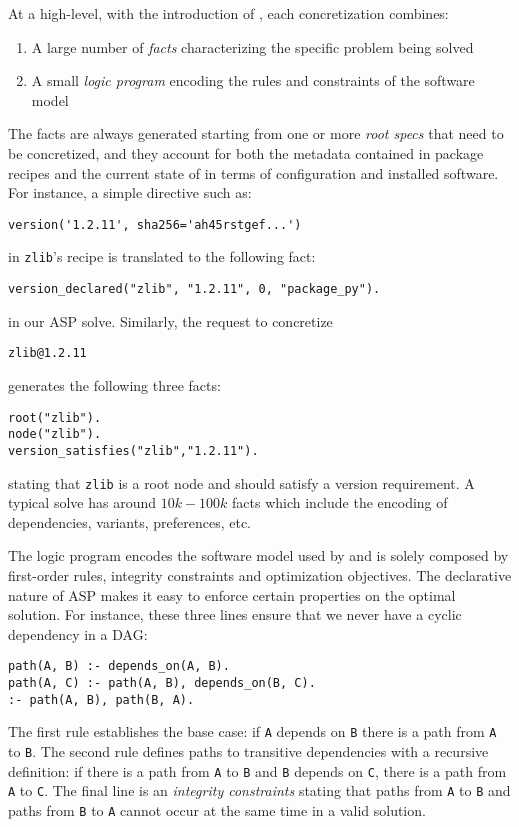 At a high-level, with the introduction of \clingo, each concretization
combines:
\begin{enumerate}
\item A large number of \emph{facts} characterizing the specific problem being solved
\item A small \emph{logic program} encoding the rules and constraints of the software model
\end{enumerate}
The facts are always generated starting from one or more 
\emph{root specs} that need to be concretized, and they account 
for both the metadata contained in package recipes and the 
current state of \spack{} in terms of configuration and 
installed software.
For instance, a simple directive such as:
\begin{verbatim}
version('1.2.11', sha256='ah45rstgef...')
\end{verbatim}
in \texttt{zlib}'s recipe is translated to the following fact:
\begin{verbatim}
version_declared("zlib", "1.2.11", 0, "package_py").
\end{verbatim}
in our ASP solve. Similarly, the request to concretize
\begin{verbatim}
zlib@1.2.11
\end{verbatim}
generates the following three facts:
\begin{verbatim}
root("zlib").
node("zlib").
version_satisfies("zlib","1.2.11").
\end{verbatim}
stating that \texttt{zlib} is a root node and should satisfy
a version requirement.
A typical solve has around $10k-100k$ facts which include
the encoding of dependencies, variants, preferences, etc.

The logic program encodes the software model used by \spack{}
and is solely composed by first-order rules, integrity 
constraints and optimization objectives. 
The declarative nature of ASP makes it easy to enforce 
certain properties on the optimal solution. For instance, 
these three lines ensure that we never have a cyclic dependency
in a DAG:
\begin{verbatim}
path(A, B) :- depends_on(A, B).
path(A, C) :- path(A, B), depends_on(B, C).
:- path(A, B), path(B, A).
\end{verbatim}
The first rule establishes the base case: if \texttt{A} depends
on \texttt{B} there is a path from \texttt{A} to \texttt{B}.
The second rule defines paths to transitive dependencies 
with a recursive definition: if there is a path from \texttt{A} 
to \texttt{B} and \texttt{B} depends on \texttt{C}, there is
a path from \texttt{A} to \texttt{C}. The final line is an 
\emph{integrity constraints} stating that paths from \texttt{A} 
to \texttt{B} and paths from \texttt{B} to \texttt{A} cannot 
occur at the same time in a valid solution.

